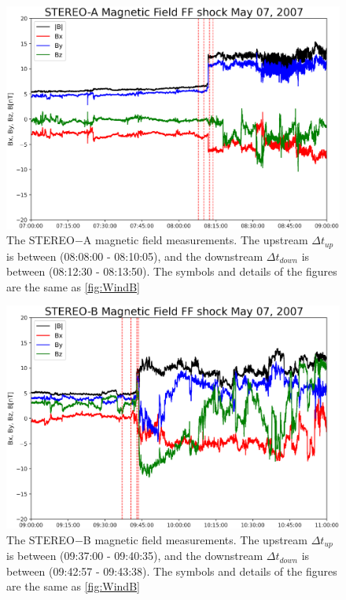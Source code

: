 \documentclass[draft]{agujournal2019}
\begin{document}
\pagebreak

\begin{figure}[!t]
\centering
\includegraphics[width=1\textwidth]{jgr-2023-ipshocks-f09.eps}
\caption{The STEREO$-$A magnetic field measurements. The upstream $\Delta t_{up}$ is between (08:08:00 - 08:10:05), and the downstream $\Delta t_{down}$ is between (08:12:30 - 08:13:50). The symbols and details of the figures are the same as \ref{fig:WindB}}
\label{fig:staB}
\end{figure}

\pagebreak

\begin{figure}[!t]
\centering
\includegraphics[width=1.\textwidth]{jgr-2023-ipshocks-f10.eps}
\caption{The STEREO$-$B magnetic field measurements. The upstream $\Delta t_{up}$ is between (09:37:00 - 09:40:35), and the downstream $\Delta t_{down}$ is between (09:42:57 - 09:43:38). The symbols and details of the figures are the same as \ref{fig:WindB}}
\label{fig:stbB}
\end{figure}
\end{document}
